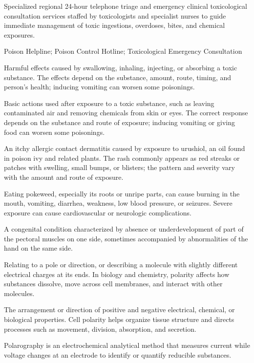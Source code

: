  Specialized regional 24-hour telephone triage and emergency clinical toxicological consultation services staffed by toxicologists and specialist nurses to guide immediate management of toxic ingestions, overdoses, bites, and chemical exposures.

\synonyms
Poison Helpline; Poison Control Hotline; Toxicological Emergency Consultation

 Harmful effects caused by swallowing, inhaling, injecting, or absorbing a toxic substance. The effects depend on the substance, amount, route, timing, and person’s health; inducing vomiting can worsen some poisonings.

 Basic actions used after exposure to a toxic substance, such as leaving contaminated air and removing chemicals from skin or eyes. The correct response depends on the substance and route of exposure; inducing vomiting or giving food can worsen some poisonings.

 An itchy allergic contact dermatitis caused by exposure to urushiol, an oil found in poison ivy and related plants. The rash commonly appears as red streaks or patches with swelling, small bumps, or blisters; the pattern and severity vary with the amount and route of exposure.

 Eating pokeweed, especially its roots or unripe parts, can cause burning in the mouth, vomiting, diarrhea, weakness, low blood pressure, or seizures. Severe exposure can cause cardiovascular or neurologic complications.

 A congenital condition characterized by absence or underdevelopment of part of the pectoral
muscles on one side, sometimes accompanied by abnormalities of the hand on the same side.

 Relating to a pole or direction, or describing a molecule with slightly different electrical charges at its ends. In biology and chemistry, polarity affects how substances dissolve, move across cell membranes, and interact with other molecules.

 The arrangement or direction of positive and negative electrical, chemical, or biological properties. Cell polarity helps organize tissue structure and directs processes such as movement, division, absorption, and secretion.

 Polarography is an electrochemical analytical method that measures current while voltage changes at an electrode to identify or quantify reducible substances.

